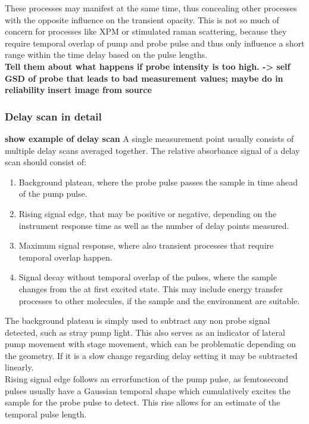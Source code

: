 \documentclass[twoside,openright]{scrreprt}
\begin{document}
These processes may manifest at the same time, thus concealing other processes with the opposite influence on the transient opacity. This is not so much of concern for processes like XPM or stimulated raman scattering, because they require temporal overlap of pump and probe pulse and thus only influence a short range within the time delay based on the pulse lengths. \\

\textbf{
Tell them about what happens if probe intensity is too high. -> self GSD of probe that leads to bad measurement values; maybe do in reliability}
\textbf{insert image from source}
\subsubsection{Delay scan in detail}
\textbf{show example of delay scan}
A single measurement point usually consists of multiple delay scans averaged together. The relative absorbance signal of a delay scan should consist of:
\begin{enumerate}
\item Background plateau, where the probe pulse passes the sample in time ahead of the pump pulse.
\item Rising signal edge, that may be positive or negative, depending on the instrument response time as well as the number of delay points measured.
\item Maximum signal response, where also transient processes that require temporal overlap happen.
\item Signal decay without temporal overlap of the pulses, where the sample changes from the at first excited state. This may include energy transfer processes to other molecules, if the sample and the environment are suitable.
\end{enumerate}
The background plateau is simply used to subtract any non probe signal detected, such as stray pump light. This also serves as an indicator of lateral pump movement with stage movement, which can be problematic depending on the geometry. If it is a slow change regarding delay setting it may be subtracted linearly.\\
Rising signal edge follows an errorfunction of the pump pulse, as femtosecond pulses usually have a Gaussian temporal shape which cumulatively excites the sample for the probe pulse to detect. This rise allows for an estimate of the temporal pulse length.
\end{document}
